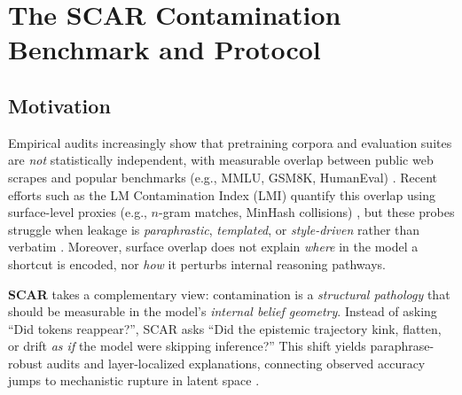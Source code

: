 \documentclass[11pt]{article}
\begin{document}
\section{The SCAR Contamination Benchmark and Protocol}
\label{sec:scar-benchmark-protocol}

\subsection*{Motivation}
Empirical audits increasingly show that pretraining corpora and evaluation suites are \emph{not} statistically independent, with measurable overlap between public web scrapes and popular benchmarks (e.g., MMLU, GSM8K, HumanEval) \citep{dodge2021documenting,hendrycks2021mmlu,cobbe2021gsm8k,chen2021humaneval}. Recent efforts such as the LM Contamination Index (LMI) quantify this overlap using surface-level proxies (e.g., $n$-gram matches, MinHash collisions) \citep{gudibande2023lmcontamination,broder1997minhash,raunak2023tokenoverlap}, but these probes struggle when leakage is \emph{paraphrastic}, \emph{templated}, or \emph{style-driven} rather than verbatim \citep{ribeiro2020checklist,iyyer2018scpn}. Moreover, surface overlap does not explain \emph{where} in the model a shortcut is encoded, nor \emph{how} it perturbs internal reasoning pathways.

\textbf{SCAR} takes a complementary view: contamination is a \emph{structural pathology} that should be measurable in the model’s \emph{internal belief geometry}. Instead of asking “Did tokens reappear?”, SCAR asks “Did the epistemic trajectory kink, flatten, or drift \emph{as if} the model were skipping inference?” This shift yields paraphrase-robust audits and layer-localized explanations, connecting observed accuracy jumps to mechanistic rupture in latent space \citep{raghu2017svcca,kornblith2019cka,amari2016ig,crooks2007measuring}.
\end{document}
